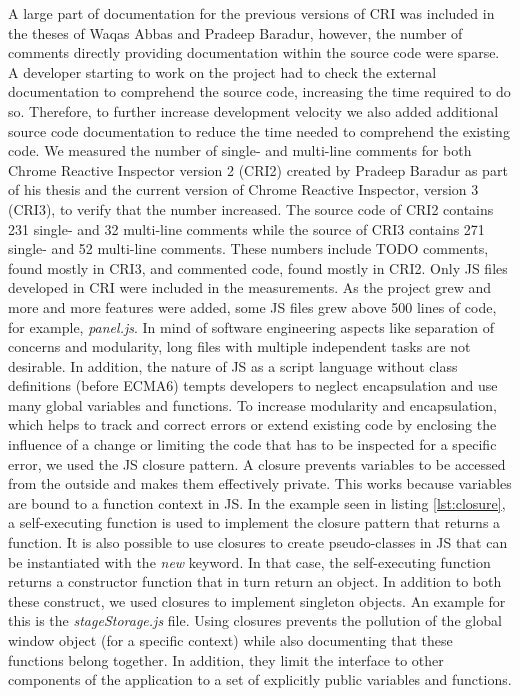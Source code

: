 A large part of documentation for the previous versions of CRI was included in the theses of Waqas Abbas and Pradeep Baradur, however, the number of comments directly providing documentation within the source code were sparse. A developer starting to work on the project had to check the external documentation to comprehend the source code, increasing the time required to do so. Therefore, to further increase development velocity we also added additional source code documentation to reduce the time needed to comprehend the existing code. We measured the number of single- and multi-line comments for both Chrome Reactive Inspector version 2 (CRI2) created by Pradeep Baradur as part of his thesis and the current version of Chrome Reactive Inspector, version 3 (CRI3), to verify that the number increased. The source code of CRI2 contains 231 single- and 32 multi-line comments while the source of CRI3 contains 271 single- and 52 multi-line comments. These numbers include TODO comments, found mostly in CRI3, and commented code, found mostly in CRI2. Only JS files developed in CRI were included in the measurements. 
As the project grew and more and more features were added, some JS files grew above 500 lines of code, for example, \emph{panel.js}. In mind of software engineering aspects like separation of concerns and modularity, long files with multiple independent tasks are not desirable. In addition, the nature of JS as a script language without class definitions (before ECMA6) tempts developers to neglect encapsulation and use many global variables and functions. To increase modularity and encapsulation, which helps to track and correct errors or extend existing code by enclosing the influence of a change or limiting the code that has to be inspected for a specific error, we used the JS closure pattern. A closure prevents variables to be accessed from the outside and makes them effectively private. This works because variables are bound to a function context in JS. In the example seen in listing \ref{lst:closure}, a self-executing function is used to implement the closure pattern that returns a function. It is also possible to use closures to create pseudo-classes in JS that can be instantiated with the \emph{new} keyword. In that case, the self-executing function returns a constructor function that in turn return an object. In addition to both these construct, we used closures to implement singleton objects. An example for this is the \emph{stageStorage.js} file. Using closures prevents the pollution of the global window object (for a specific context) while also documenting that these functions belong together. In addition, they limit the interface to other components of the application to a set of explicitly public variables and functions.
